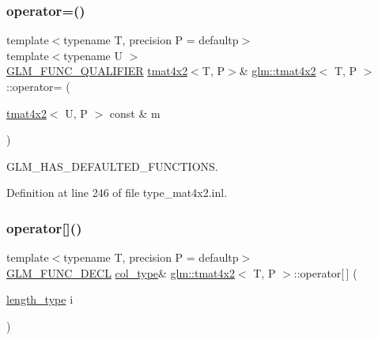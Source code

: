\mbox{\label{structglm_1_1tmat4x2_ac513919fdc4d1506721e4e6bf78556a7}} 
\subsubsection{\texorpdfstring{operator=()}{operator=()}\hspace{0.1cm}{\footnotesize\ttfamily [3/3]}}
{\footnotesize\ttfamily template$<$typename T, precision P = defaultp$>$ \\
template$<$typename U $>$ \\
\mbox{\hyperlink{setup_8hpp_a33fdea6f91c5f834105f7415e2a64407}{G\+L\+M\+\_\+\+F\+U\+N\+C\+\_\+\+Q\+U\+A\+L\+I\+F\+I\+ER}} \mbox{\hyperlink{structglm_1_1tmat4x2}{tmat4x2}}$<$T, P$>$\& \mbox{\hyperlink{structglm_1_1tmat4x2}{glm\+::tmat4x2}}$<$ T, P $>$\+::operator= (\begin{DoxyParamCaption}\item[{\mbox{\hyperlink{structglm_1_1tmat4x2}{tmat4x2}}$<$ U, P $>$ const \&}]{m }\end{DoxyParamCaption})}



G\+L\+M\+\_\+\+H\+A\+S\+\_\+\+D\+E\+F\+A\+U\+L\+T\+E\+D\+\_\+\+F\+U\+N\+C\+T\+I\+O\+NS. 



Definition at line 246 of file type\+\_\+mat4x2.\+inl.

\mbox{\label{structglm_1_1tmat4x2_ac3af29ca90810fd2da26fec983a46821}} 
\subsubsection{\texorpdfstring{operator[]()}{operator[]()}\hspace{0.1cm}{\footnotesize\ttfamily [1/2]}}
{\footnotesize\ttfamily template$<$typename T, precision P = defaultp$>$ \\
\mbox{\hyperlink{setup_8hpp_ab2d052de21a70539923e9bcbf6e83a51}{G\+L\+M\+\_\+\+F\+U\+N\+C\+\_\+\+D\+E\+CL}} \mbox{\hyperlink{structglm_1_1tmat4x2_ac775231a890f4ea29cd0073670309b3a}{col\+\_\+type}}\& \mbox{\hyperlink{structglm_1_1tmat4x2}{glm\+::tmat4x2}}$<$ T, P $>$\+::operator\mbox{[}$\,$\mbox{]} (\begin{DoxyParamCaption}\item[{\mbox{\hyperlink{structglm_1_1tmat4x2_a28aaf36ee36edef6715c1fae6874f530}{length\+\_\+type}}}]{i }\end{DoxyParamCaption})}

